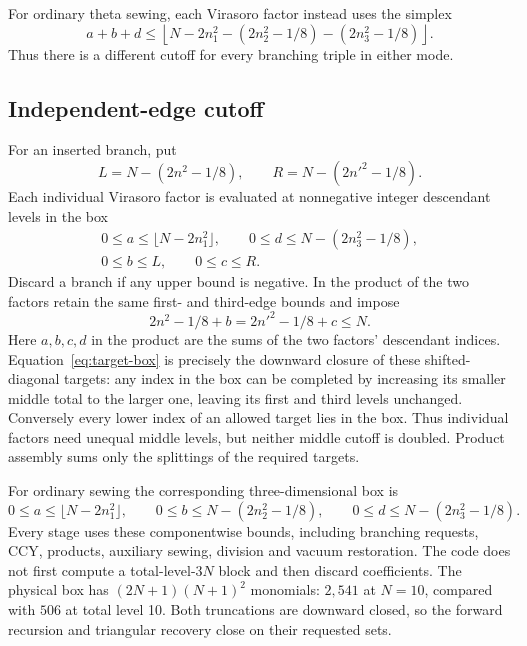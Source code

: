 \documentclass[11pt]{article}
\numberwithin{equation}{section}
\begin{document}
For ordinary theta sewing, each Virasoro factor instead uses the simplex
\begin{equation}
 a+b+d\le\left\lfloor N-2n_1^2-(2n_2^2-1/8)-(2n_3^2-1/8)\right\rfloor.
\end{equation}
Thus there is a different cutoff for every branching triple in either mode.

\subsection{Independent-edge cutoff}
For an inserted branch, put
\begin{equation}
 L=N-(2n^2-1/8),\qquad R=N-(2n'^2-1/8).
\end{equation}
Each individual Virasoro factor is evaluated at nonnegative integer
descendant levels in the box
\begin{equation}
 \begin{gathered}
 0\le a\le\lfloor N-2n_1^2\rfloor,\qquad
 0\le d\le N-(2n_3^2-1/8),\\
 0\le b\le L,\qquad 0\le c\le R.
 \end{gathered}
 \label{eq:target-box}
\end{equation}
Discard a branch if any upper bound is negative. In the product of the two
factors retain the same first- and third-edge bounds and impose
\begin{equation}
 2n^2-1/8+b=2n'^2-1/8+c\le N.
 \label{eq:box-diagonal}
\end{equation}
Here $a,b,c,d$ in the product are the sums of the two factors' descendant
indices. Equation~\eqref{eq:target-box} is precisely the downward closure
of these shifted-diagonal targets: any index in the box can be completed
by increasing its smaller middle total to the larger one, leaving its first
and third levels unchanged. Conversely every lower index of an allowed
target lies in the box. Thus individual factors need unequal middle levels,
but neither middle cutoff is doubled. Product assembly sums only the
splittings of the required targets.

For ordinary sewing the corresponding three-dimensional box is
\begin{equation}
 0\le a\le\lfloor N-2n_1^2\rfloor,\qquad
 0\le b\le N-(2n_2^2-1/8),\qquad
 0\le d\le N-(2n_3^2-1/8).
\end{equation}
Every stage uses these componentwise bounds, including branching requests,
CCY, products, auxiliary sewing, division and vacuum restoration. The code
does not first compute a total-level-$3N$ block and then discard coefficients.
The physical box has $(2N+1)(N+1)^2$ monomials: $2{,}541$ at $N=10$,
compared with $506$ at total level 10. Both truncations are downward closed,
so the forward recursion and triangular recovery close on their requested sets.
\end{document}

